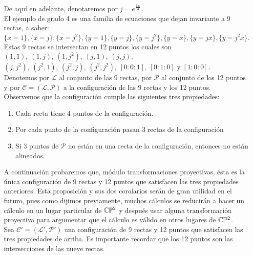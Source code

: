 De aquí en adelante, denotaremos por $j=e^{\frac{2\pi i}{3}}$.
\\


El ejemplo de grado 4 es una familia de ecuaciones que dejan invariante a 9 rectas, a saber: $\{x=1\}, \{x=j\}, \{x=j^{2}\}, \{y=1\}, \{y=j\}, \{y=j^{2}\}, \{y=x\}, \{y=jx\}, \{y=j^{2}x\}$.
\\

Estas 9 rectas se intersectan en 12 puntos los cuales son $(1,1),\ (1,j),\ (1,j^{2}),\ (j,1),\ (j,j),$\\ $(j,j^{2}),\ (j^{2},1),\ (j^{2},j),\ (j^{2},j^{2}),\ [0:0:1],\ [0:1:0]$ y $[1:0:0]$.
\\

Denotemos por $\mathcal{L}$ al conjunto de las 9 rectas, por $\mathcal{P}$ al conjunto de los 12 puntos y por $\mathcal{C=(L,P)}$ a la configuración de las 9 rectas y los 12 puntos.
\\

Observemos que la configuración cumple las siguientes tres propiedades:

\begin{enumerate}

\item Cada recta tiene 4 puntos de la configuración.
\item Por cada punto de la configuración pasan 3 rectas de la configuración
\item Si 3 puntos de $\mathcal{P}$ no están en una recta de la configuración, entonces no están alineados.

\end{enumerate} 

A continuación probaremos que, módulo transformaciones proyectivas, ésta es la única configuración de 9 rectas y 12 puntos que satisfacen las tres propiedades anteriores. Esta proposición y sus dos corolarios serán de gran utilidad en el futuro, pues como dijimos previamente, muchos cálculos se reducirán a hacer un cálculo en un lugar particular de $\mathbb{C}\mathbb{P}^2$ y después usar alguna transformación proyectiva para argumentar que el cálculo es válido en otros lugares de $\mathbb{C}\mathbb{P}^2$.
\\

Sea $\mathcal{C'=(L',P')}$ una configuración de 9 rectas y 12 puntos que satisfacen las tres propiedades de arriba. Es importante recordar que los 12 puntos son las intersecciones de las nueve rectas.

